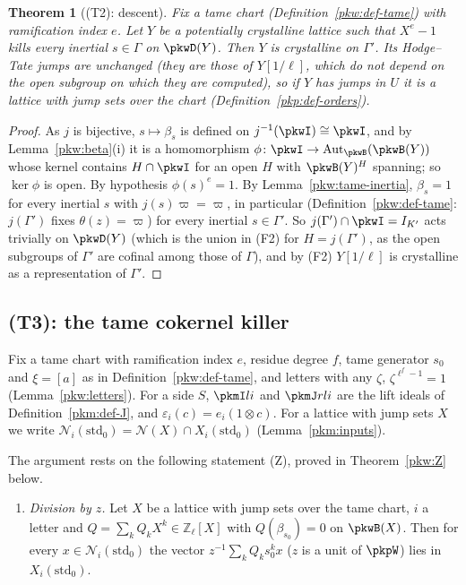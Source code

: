 \documentclass[10pt]{amsart}
\newtheorem{theorem}{Theorem}[section]
\theoremstyle{definition}
\theoremstyle{remark}
\newcommand{\Z}{\mathbb Z}
\begin{document}
\begin{theorem}[(T2): descent]\label{pkw:T2}
Fix a tame chart (Definition~\ref{pkw:def-tame}) with ramification index $e$. Let $Y$ be a potentially
crystalline lattice such that $X^e-1$ kills every inertial $s\in\Gamma$ on $\pkwD(Y)$. Then $Y$ is
crystalline on $\Gamma'$. Its Hodge--Tate jumps are unchanged (they are those of $Y[1/\ell]$, which do not
depend on the open subgroup on which they are computed), so if $Y$ has jumps in $U$ it is a lattice with
jump sets over the chart (Definition~\ref{pkp:def-orders}).
\end{theorem}

\begin{proof}
As $j$ is bijective, $s\mapsto\beta_s$ is defined on $j^{-1}(\pkwI)\cong\pkwI$, and by
Lemma~\ref{pkw:beta}(i) it is a homomorphism $\phi\colon\pkwI\to\operatorname{Aut}_{\pkwB}(\pkwB(Y))$ whose
kernel contains $H\cap\pkwI$ for an open $H$ with $\pkwB(Y)^H$ spanning; so $\ker\phi$ is open. By
hypothesis $\phi(s)^e=1$. By Lemma~\ref{pkw:tame-inertia}, $\beta_s=1$ for every inertial $s$ with
$j(s)\varpi=\varpi$, in particular (Definition~\ref{pkw:def-tame}: $j(\Gamma')$ fixes $\theta(z)=\varpi$) for
every inertial $s\in\Gamma'$. So $j(\Gamma')\cap\pkwI=I_{K'}$ acts trivially on $\pkwD(Y)$ (which is the union
in (F2) for $H=j(\Gamma')$, as the open subgroups of $\Gamma'$ are cofinal among those of $\Gamma$), and by (F2)
$Y[1/\ell]$ is crystalline as a representation of $\Gamma'$.
\end{proof}

\subsection{(T3): the tame cokernel killer}\label{pkw:ss-T3}

Fix a tame chart with ramification index $e$, residue degree $f$, tame generator $s_0$ and $\xi=[a]$ as in
Definition~\ref{pkw:def-tame}, and letters with any $\zeta$, $\zeta^{\ell^f-1}=1$ (Lemma~\ref{pkw:letters}).
For a side $S$, $\pkmI li$ and $\pkmJ rli$ are the lift ideals of Definition~\ref{pkm:def-J}, and
$\varepsilon_i(c)=e_i(1\otimes c)$. For a lattice with jump sets $X$ we write
$\mathcal N_i(\mathrm{std}_0)=\mathcal N(X)\cap X_i(\mathrm{std}_0)$ (Lemma~\ref{pkm:inputs}).

The argument rests on the following statement (Z), proved in Theorem~\ref{pkw:Z} below.

\begin{enumerate}
\item[(Z)] \emph{Division by $z$.} Let $X$ be a lattice with jump sets over the tame chart, $i$ a letter and
$Q=\sum_kQ_kX^k\in\Z_\ell[X]$ with $Q(\beta_{s_0})=0$ on $\pkwB(X)$. Then for every
$x\in\mathcal N_i(\mathrm{std}_0)$ the vector $z^{-1}\sum_kQ_ks_0^kx$ ($z$ is a unit of $\pkpW$) lies in
$X_i(\mathrm{std}_0)$.
\end{enumerate}
\end{document}
